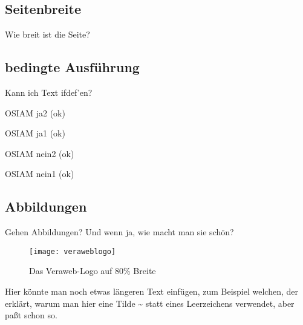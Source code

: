 \documentclass{tarentanleitung}
\begin{document}
\subsection{Seitenbreite}

Wie breit ist die Seite? %

\the\textwidth

\subsection{bedingte Ausführung}

Kann ich Text ifdef'en?

\newif\ifosiam
\osiamtrue

\ifosiam
 OSIAM ja2 (ok)
\else
 OSIAM nein2
\fi

\ifosiam
 OSIAM ja1 (ok)
\fi

\ifosiam\else
 OSIAM nein1
\fi

\osiamfalse

\ifosiam
 OSIAM ja2
\else
 OSIAM nein2 (ok)
\fi

\ifosiam
 OSIAM ja1
\fi

\ifosiam\else
 OSIAM nein1 (ok)
\fi

\subsection{Abbildungen}

Gehen Abbildungen? Und wenn ja, wie macht man sie schön?

\begin{figure}[h!]
 \centering\texttt{[image: veraweblogo]}
 \caption{Das Veraweb-Logo auf 80\% Breite}
 \label{fig:logovw}
\end{figure}

Hier könnte man noch etwas längeren Text einfügen, zum Beispiel
welchen, der erklärt, warum man hier eine Tilde \~{} statt eines
Leerzeichens verwendet, aber paßt schon so.

\newpage
\end{document}
